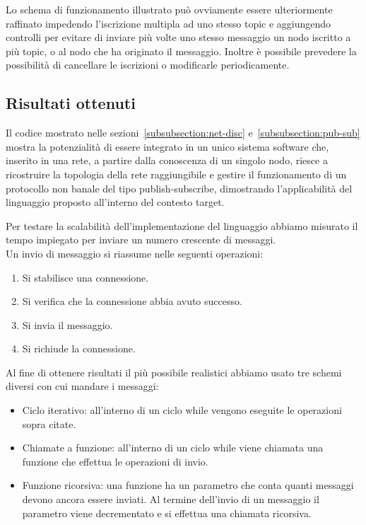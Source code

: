 \documentclass[10pt]{article}
\begin{document}
Lo schema di funzionamento illustrato può ovviamente essere ulteriormente raffinato impedendo l'iscrizione multipla ad uno stesso topic e aggiungendo controlli per evitare di inviare più volte uno stesso messaggio un nodo iscritto a più topic, o al nodo che ha originato il messaggio. Inoltre è possibile prevedere la possibilità di cancellare le iscrizioni o modificarle periodicamente.

\subsection{Risultati ottenuti}\label{subsection:risultati}

Il codice mostrato nelle sezioni~\ref{subsubsection:net-disc} e~\ref{subsubsection:pub-sub} mostra la potenzialità di essere integrato in un unico sistema software che, inserito in una rete, a partire dalla conoscenza di un singolo nodo, riesce a ricostruire la topologia della rete raggiungibile e gestire il funzionamento di un protocollo non banale del tipo publish-subscribe, dimostrando l'applicabilità del linguaggio proposto all'interno del contesto target. 

Per testare la scalabilità dell'implementazione del linguaggio abbiamo misurato il tempo impiegato per inviare un numero crescente di messaggi.\\
Un invio di messaggio si riassume nelle seguenti operazioni:
\begin{enumerate}
	\item Si stabilisce una connessione.
	\item{Si verifica che la connessione abbia avuto successo.}
	\item Si invia il messaggio. 
	\item Si richiude la connessione.
\end{enumerate}

Al fine di ottenere risultati il più possibile realistici abbiamo usato tre schemi diversi con cui mandare i messaggi:
\begin{itemize}
	\item Ciclo iterativo: all'interno di un ciclo while vengono eseguite le operazioni sopra citate.
	\item Chiamate a funzione: all'interno di un ciclo while viene chiamata una funzione che effettua le operazioni di invio.
	\item Funzione ricorsiva: una funzione ha un parametro che conta quanti messaggi devono ancora essere inviati. Al termine dell'invio di un messaggio il parametro viene decrementato e si effettua una chiamata ricorsiva.
\end{itemize}
\end{document}
